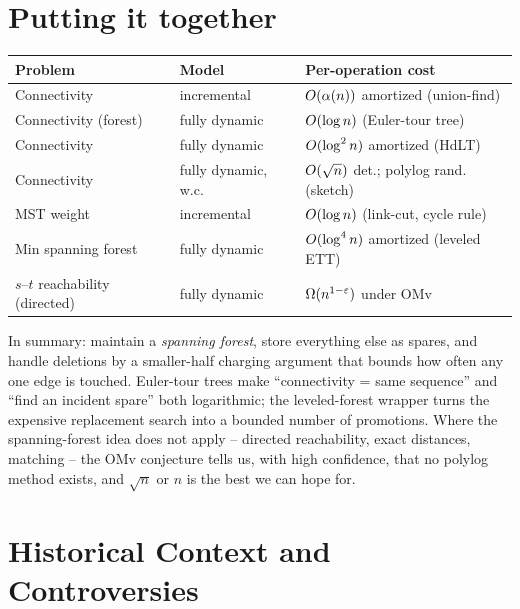 \section{Putting it together}
\label{ch39:summary}

\begin{complexitybox}
\renewcommand{\arraystretch}{1.25}
\begin{center}
\begin{tabular}{@{}lll@{}}
\toprule
Problem & Model & Per-operation cost \\
\midrule
Connectivity & incremental & $O(\alpha(n))$ amortized (union-find) \\
Connectivity (forest) & fully dynamic & $O(\log n)$ (Euler-tour tree) \\
Connectivity & fully dynamic & $O(\log^2 n)$ amortized (HdLT) \\
Connectivity & fully dynamic, w.c. & $O(\sqrt n)$ det.; polylog rand. (sketch) \\
MST weight & incremental & $O(\log n)$ (link-cut, cycle rule) \\
Min spanning forest & fully dynamic & $O(\log^4 n)$ amortized (leveled ETT) \\
$s$--$t$ reachability (directed) & fully dynamic & $\Omega(n^{1-\varepsilon})$ under OMv \\
\bottomrule
\end{tabular}
\end{center}
\end{complexitybox}

In summary: maintain a \emph{spanning forest}, store everything else as
spares, and handle deletions by a smaller-half charging argument that bounds how
often any one edge is touched. Euler-tour trees make ``connectivity = same
sequence'' and ``find an incident spare'' both logarithmic; the leveled-forest
wrapper turns the expensive replacement search into a bounded number of
promotions. Where the spanning-forest idea does not apply -- directed
reachability, exact distances, matching -- the OMv conjecture tells us, with high
confidence, that no polylog method exists, and $\sqrt n$ or $n$ is the best we can
hope for.

\section{Historical Context and Controversies}

